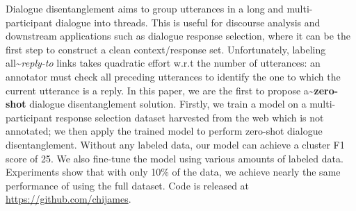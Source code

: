 Dialogue disentanglement aims to group utterances in a long and multi-participant dialogue into threads. This is useful for discourse analysis and downstream applications such as dialogue response selection, where it can be the first step to construct a clean context/response set. Unfortunately, labeling all{\textasciitilde}\emph{reply-to} links takes quadratic effort w.r.t the number of utterances: an annotator must check all preceding utterances to identify the one to which the current utterance is a reply. In this paper, we are the first to propose a{\textasciitilde}\textbf{zero-shot} dialogue disentanglement solution. Firstly, we train a model on a multi-participant response selection dataset harvested from the web which is not annotated; we then apply the trained model to perform zero-shot dialogue disentanglement. Without any labeled data, our model can achieve a cluster F1 score of 25. We also fine-tune the model using various amounts of labeled data. Experiments show that with only 10\% of the data, we achieve nearly the same performance of using the full dataset. Code is released at \url{https://github.com/chijames}.

